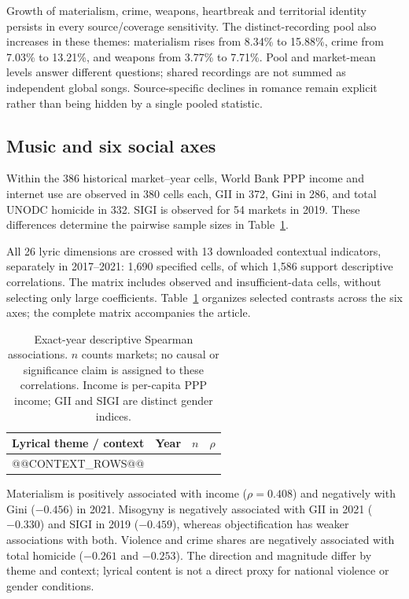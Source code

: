 \documentclass[10pt,a4paper,twocolumn]{article}
\begin{document}
Growth of materialism, crime, weapons, heartbreak and territorial identity persists in every source/coverage sensitivity. The distinct-recording pool also increases in these themes: materialism rises from 8.34\% to 15.88\%, crime from 7.03\% to 13.21\%, and weapons from 3.77\% to 7.71\%. Pool and market-mean levels answer different questions; shared recordings are not summed as independent global songs. Source-specific declines in romance remain explicit rather than being hidden by a single pooled statistic.

\subsection{Music and six social axes}
Within the 386 historical market--year cells, World Bank PPP income and internet use are observed in 380 cells each, GII in 372, Gini in 286, and total UNODC homicide in 332. SIGI is observed for 54 markets in 2019. These differences determine the pairwise sample sizes in Table~\ref{tab:context}.

All 26 lyric dimensions are crossed with 13 downloaded contextual indicators, separately in 2017--2021: 1,690 specified cells, of which 1,586 support descriptive correlations. The matrix includes observed and insufficient-data cells, without selecting only large coefficients. Table~\ref{tab:context} organizes selected contrasts across the six axes; the complete matrix accompanies the article.

\begin{table}[t]
\caption{Exact-year descriptive Spearman associations. $n$ counts markets; no causal or significance claim is assigned to these correlations. Income is per-capita PPP income; GII and SIGI are distinct gender indices.}
\label{tab:context}
\centering\scriptsize\setlength{\tabcolsep}{3pt}
\begin{tabularx}{\columnwidth}{@{}Xrrr@{}}
\toprule Lyrical theme / context & Year & $n$ & $\rho$ \\
\midrule
@@CONTEXT_ROWS@@
\bottomrule
\end{tabularx}
\end{table}

Materialism is positively associated with income ($\rho=0.408$) and negatively with Gini ($-0.456$) in 2021. Misogyny is negatively associated with GII in 2021 ($-0.330$) and SIGI in 2019 ($-0.459$), whereas objectification has weaker associations with both. Violence and crime shares are negatively associated with total homicide ($-0.261$ and $-0.253$). The direction and magnitude differ by theme and context; lyrical content is not a direct proxy for national violence or gender conditions.
\end{document}
